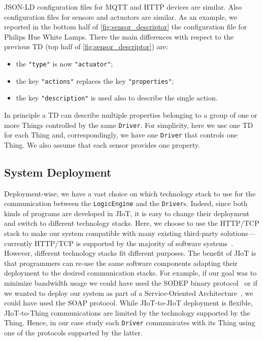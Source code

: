 JSON-LD configuration files for MQTT and HTTP devices are similar. Also
configuration files for sensors and actuators are similar. As an example, we
reported in the bottom half of \cref{fig:sensor_descriptor} the configuration
file for Philips Hue White Lamps. There the main differences with respect to
the previous TD (top half of \cref{fig:sensor_descriptor}) are:
\begin{itemize}
  \item the \lstinline{"type"} is now {\small\color{color:comment}\texttt{"actuator"}};
  \item the key \lstinline{"actions"} replaces the key \lstinline{"properties"};
  \item the key \lstinline{"description"} is used also to describe the single action.
\end{itemize}

In principle a TD can describe multiple properties belonging to a
group of one or more Things controlled by the same
\texttt{Driver}. For simplicity, here we use one TD for each Thing
and, correspondingly, we have one \texttt{Driver} that controls one
Thing. We also assume that each sensor provides one property.

\subsection{System Deployment}

Deployment-wise, we have a vast choice on which technology stack to use for
the communication between the \texttt{LogicEngine} and the \texttt{Driver}s.
Indeed, since both kinds of programs are developed in JIoT, it is easy to
change their deployment and switch to different technology stacks. Here, we
choose to use the HTTP/TCP stack to make our system compatible with many
existing third-party solutions---currently HTTP/TCP is supported by the
majority of software systems~\cite{richardson2008restful}. However, different
technology stacks fit different purposes. The benefit of JIoT is that
programmers can re-use the same software components adapting their deployment
to the desired communication stacks. For example, if our goal was to minimize
bandwidth usage we could have used the SODEP binary
protocol~\cite{MontesiGZ14} or if we wanted to deploy our system as part of a
Service-Oriented Architecture~\cite{Erl07}, we could have used the SOAP
protocol. While JIoT-to-JIoT deployment is flexible, JIoT-to-Thing
communications are limited by the technology supported by the Thing. Hence, in
our case study each \texttt{Driver} communicates with its Thing using one of
the protocols supported by the latter.



